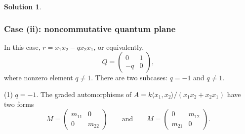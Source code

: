 \documentclass[a4paper,10pt]{amsart}
\theoremstyle{definition}
\newtheorem{solution}[theorem]{Solution}
\numberwithin{equation}{section}
\begin{document}
\begin{solution}
\begin{enumerate}
%
\end{enumerate}
\end{solution}




\subsubsection{Case (ii): noncommutative quantum plane
}In this case, $r=x_1x_2-qx_2x_1$, or equivalently,
$$Q=\left(
\begin{array}{cc}
0 & 1\\
-q  &  0
\end{array}
\right),$$
where  nonzero element $q\neq 1$. There are two subcases: $q=-1$ and $q\neq 1$.

\noindent (1) $q=-1$. The graded automorphisms of $A=k\langle x_1,x_2\rangle/(x_1x_2+x_2x_1)$ have two forms
$$
M=
\left(
\begin{array}{cc}
m_{11}  & 0\\
0   &m_{22}
\end{array}
\right)\qquad\text{and}\qquad
M=
\left(
\begin{array}{cc}
0  & m_{12}\\
m_{21}   &0
\end{array}
\right).
$$
\end{document}
